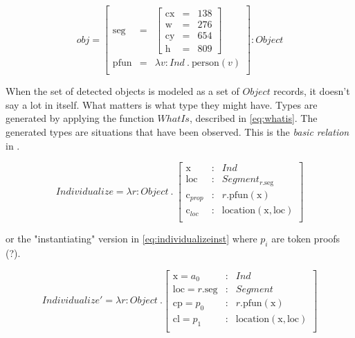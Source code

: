 \documentclass[11pt, a4paper]{article}
\begin{document}
\begin{equation}\label{eq:detindrec}
obj =
\left[\begin{array}{rcl}
\text{seg} &=& \left[\begin{array}{rcl}
\text{cx} &=& 138\\
\text{w} &=& 276\\
\text{cy} &=& 654\\
\text{h} &=& 809
\end{array}\right]\\
\text{pfun} &=& \lambda v:Ind\ .\ \text{person}(v)\\
\end{array}\right] : Object\end{equation}

When the set of detected objects is modeled as a set of $Object$ records, it doesn't say a lot in itself.
What matters is what type they might have.
Types are generated by applying the function $WhatIs$, described in \autoref{eq:whatis}.
The generated types are situations that have been observed.
This is the \textit{basic relation} in \cite{LoganComputationalAnalysisApprehension1996}.


\begin{equation}\label{eq:whatis}
Individualize = \lambda r:Object\ .\ \left[\begin{array}{rcl}
\text{x} &:& Ind\\
\text{loc} &:& Segment_{r.\text{seg}}\\
\text{c}_{prop} &:& r.\text{pfun}(\text{x})\\
\text{c}_{loc} &:& \text{location}(\text{x}, \text{loc})\\
\end{array}\right]\end{equation}

or the "instantiating" version in \autoref{eq:individualizeinst} where $p_i$ are token proofs (?).

\begin{equation}\label{eq:individualizeinst}
Individualize' = \lambda r : Object\ . \left[\begin{array}{lcl}
    \text{x} = a_0 &:& Ind \\
    \text{loc} = r.\text{seg} &:& Segment\\
    \text{cp} = p_0 &:& r.\text{pfun}(\text{x}) \\
    \text{cl} = p_1 &:& \text{location}(\text{x}, \text{loc}) \\
\end{array}\right]
\end{equation}
\end{document}
